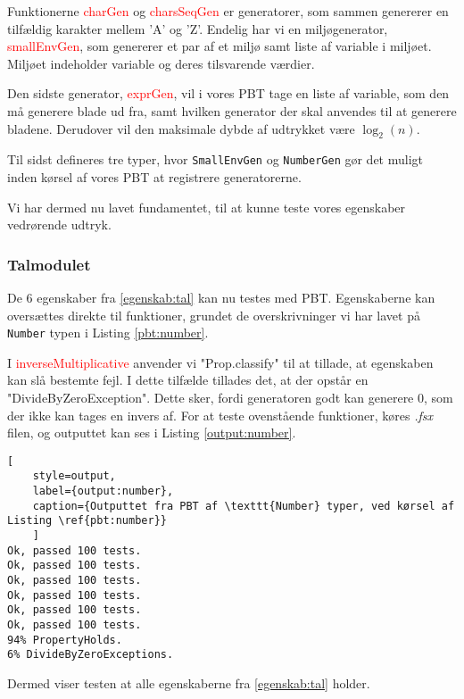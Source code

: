 Funktionerne \textcolor{red}{charGen} og \textcolor{red}{charsSeqGen} er generatorer, som sammen genererer en tilfældig karakter mellem 'A' og 'Z'. Endelig har vi en miljøgenerator, \textcolor{red}{smallEnvGen}, som genererer et par af et miljø samt liste af variable i miljøet. Miljøet indeholder variable og deres tilsvarende værdier.

Den sidste generator, \textcolor{red}{exprGen}, vil i vores PBT tage en liste af variable, som den må generere blade ud fra, samt hvilken generator der skal anvendes til at generere bladene. Derudover vil den maksimale dybde af udtrykket være \(\log_2(n)\).

Til sidst defineres tre typer, hvor \texttt{SmallEnvGen} og \texttt{NumberGen} gør det muligt inden kørsel af vores PBT at registrere generatorerne.

Vi har dermed nu lavet fundamentet, til at kunne teste vores egenskaber vedrørende udtryk.

\subsubsection{Talmodulet}\label{sec:PBT_number}
De 6 egenskaber fra \ref{egenskab:tal} kan nu testes med PBT. Egenskaberne kan oversættes direkte til funktioner, grundet de overskrivninger vi har lavet på \texttt{Number} typen i Listing \ref{pbt:number}. 


I \textcolor{red}{inverseMultiplicative} anvender vi "Prop.classify" til at tillade, at egenskaben kan slå bestemte fejl. I dette tilfælde tillades det, at der opstår en "DivideByZeroException". Dette sker, fordi generatoren godt kan generere 0, som der ikke kan tages en invers af. For at teste ovenstående funktioner, køres \textit{.fsx} filen, og outputtet kan ses i Listing \ref{output:number}.
\begin{lstlisting}[
    style=output, 
    label={output:number}, 
    caption={Outputtet fra PBT af \texttt{Number} typer, ved kørsel af Listing \ref{pbt:number}}
    ]        
Ok, passed 100 tests.
Ok, passed 100 tests.
Ok, passed 100 tests.
Ok, passed 100 tests.
Ok, passed 100 tests.
Ok, passed 100 tests.
94% PropertyHolds.
6% DivideByZeroExceptions.
\end{lstlisting}

Dermed viser testen at alle egenskaberne fra \ref{egenskab:tal} holder. 

